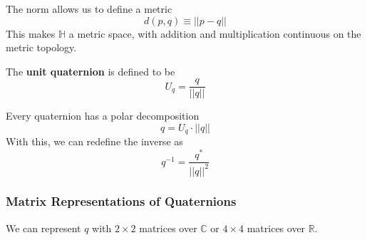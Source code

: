 \documentclass{article}
\begin{document}
    The norm allows us to define a metric 
    \begin{equation}
      d(p, q) \equiv ||p - q||
    \end{equation}
    This makes $\mathbb{H}$ a metric space, with addition and multiplication continuous on the metric topology. 

    \begin{definition}
      The \textbf{unit quaternion} is defined to be
      \begin{equation}
        U_q = \frac{q}{||q||}
      \end{equation}
    \end{definition}

    \begin{corollary}
      Every quaternion has a polar decomposition
      \begin{equation}
        q = U_q \cdot ||q||
      \end{equation}
      With this, we can redefine the inverse as
      \begin{equation}
        q^{-1} = \frac{q^*}{||q||^2}
      \end{equation}
    \end{corollary}

    \subsubsection{Matrix Representations of Quaternions}

      We can represent $q$ with $2 \times 2$ matrices over $\mathbb{C}$ or $4\times 4 $ matrices over $\mathbb{R}$. 
\end{document}
